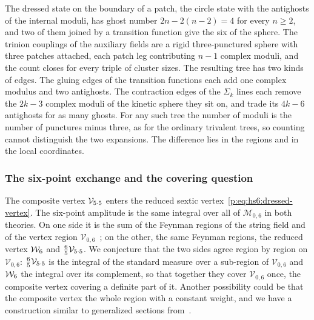 The dressed state on the boundary of a patch, the circle state with the antighosts of the internal moduli, has ghost number $2 n - 2 (n - 2) = 4$ for every $n \geq 2$, and two of them joined by a transition function give the six of the sphere.
The trinion couplings of the auxiliary fields are a rigid three-punctured sphere with three patches attached, each patch leg contributing $n - 1$ complex moduli, and the count closes for every triple of cluster sizes.
The resulting tree has two kinds of edges.
The gluing edges of the transition functions each add one complex modulus and two antighosts.
The contraction edges of the $\Sigma_k$ lines each remove the $2 k - 3$ complex moduli of the kinetic sphere they sit on, and trade its $4 k - 6$ antighosts for as many ghosts.
For any such tree the number of moduli is the number of punctures minus three, as for the ordinary trivalent trees, so counting cannot distinguish the two expansions.
The difference lies in the regions and in the local coordinates.

\subsubsection{The six-point exchange and the covering question}
\label{p:sec:ws:six-point}


The composite vertex $\mathcal{V}_{5 \cdot 5}$ enters the reduced sextic vertex~\eqref{p:eq:hs6:dressed-vertex}.
  The six-point amplitude is the same integral over all of $\mathcal M_{0,6}$ in both theories.
On one side it is the sum of the Feynman regions of the string field and of the vertex region $\mathcal V_{0,6}$~\cite{Zwiebach:1993:ClosedStringField}; on the other, the same Feynman regions, the reduced vertex $\mathcal{W}_{6}$ and $\tfrac{6}{5} \mathcal{V}_{5 \cdot 5}$.
We conjecture that the two sides agree region by region on $\mathcal V_{0,6}$: $\tfrac{6}{5} \mathcal{V}_{5 \cdot 5}$ is the integral of the standard measure over a sub-region of $\mathcal V_{0,6}$ and $\mathcal{W}_{6}$ the integral over its complement, so that together they cover $\mathcal V_{0,6}$ once, the composite vertex covering a definite part of it.
  Another possibility could be that the composite vertex the whole region with a constant weight, and we have a construction similar to generalized sections from~\cite{Sen:2015:OffshellAmplitudesSuperstring,deLacroix:2017:ClosedSuperstringField}.

